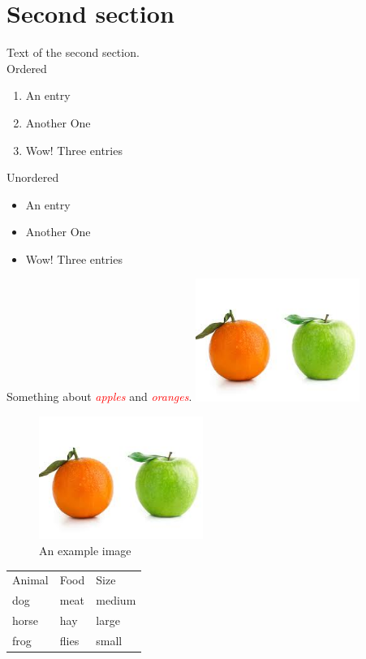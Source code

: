 \documentclass[a4paper,12pt]{book} %
\newcommand\kw[1]{\textcolor{red}{\itshape #1}}
\begin{document}
\section{Second section}
Text of the second section.
\\
Ordered
\begin{enumerate}
\item An entry
\item Another One
\item Wow! Three entries
\end{enumerate}

Unordered
\begin{itemize}
\item An entry
\item Another One
\item Wow! Three entries
\end{itemize}

Something about \kw{apples} and \kw{oranges}.
\includegraphics[height=4cm]{example-image.jpeg}
\begin{center}
\begin{figure}[ht]
\centering
\includegraphics[height=4cm,clip, trim = 5 5 5 5]{example-image.jpeg}
\caption{An example image}
\end{figure}
\end{center}
\begin{tabular}{lll}
Animal & Food  & Size   \\
dog    & meat  & medium \\
horse  & hay   & large  \\
frog   & flies & small  \\
\end{tabular}
\end{document}

